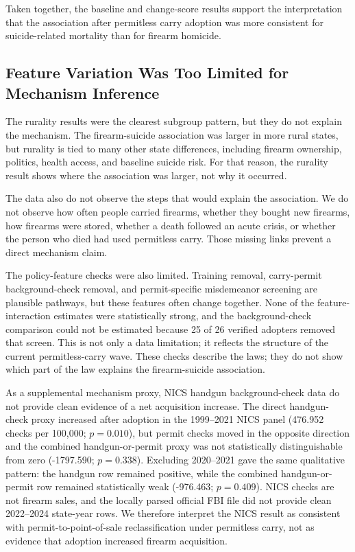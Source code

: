\documentclass[11pt]{article}
\begin{document}


Taken together, the baseline and change-score results support the interpretation that the association after permitless carry adoption was more consistent for suicide-related mortality than for firearm homicide.

\subsection*{Feature Variation Was Too Limited for Mechanism Inference}

The rurality results were the clearest subgroup pattern, but they do not explain the mechanism. The firearm-suicide association was larger in more rural states, but rurality is tied to many other state differences, including firearm ownership, politics, health access, and baseline suicide risk. For that reason, the rurality result shows where the association was larger, not why it occurred.

The data also do not observe the steps that would explain the association. We do not observe how often people carried firearms, whether they bought new firearms, how firearms were stored, whether a death followed an acute crisis, or whether the person who died had used permitless carry. Those missing links prevent a direct mechanism claim.

The policy-feature checks were also limited. Training removal, carry-permit background-check removal, and permit-specific misdemeanor screening are plausible pathways, but these features often change together. None of the feature-interaction estimates were statistically strong, and the background-check comparison could not be estimated because 25 of 26 verified adopters removed that screen. This is not only a data limitation; it reflects the structure of the current permitless-carry wave. These checks describe the laws; they do not show which part of the law explains the firearm-suicide association.

As a supplemental mechanism proxy, NICS handgun background-check data do not provide clean evidence of a net acquisition increase. The direct handgun-check proxy increased after adoption in the 1999--2021 NICS panel (476.952 checks per 100,000; $p=0.010$), but permit checks moved in the opposite direction and the combined handgun-or-permit proxy was not statistically distinguishable from zero (-1797.590; $p=0.338$). Excluding 2020--2021 gave the same qualitative pattern: the handgun row remained positive, while the combined handgun-or-permit row remained statistically weak (-976.463; $p=0.409$). NICS checks are not firearm sales, and the locally parsed official FBI file did not provide clean 2022--2024 state-year rows. We therefore interpret the NICS result as consistent with permit-to-point-of-sale reclassification under permitless carry, not as evidence that adoption increased firearm acquisition.
\end{document}
